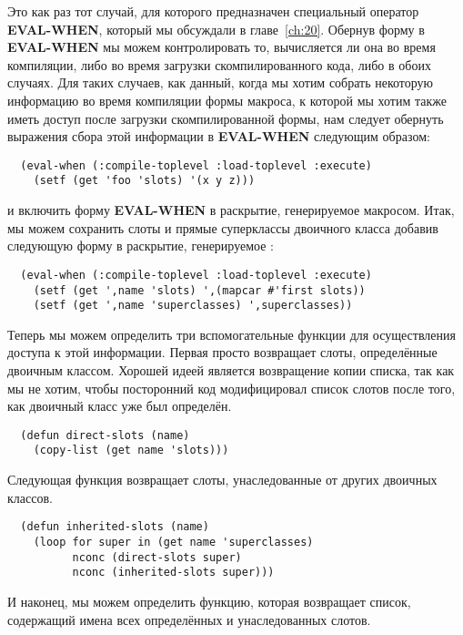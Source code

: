 Это как раз тот случай, для которого предназначен специальный оператор \textbf{EVAL-WHEN},
который мы обсуждали в главе~\ref{ch:20}. Обернув форму в \textbf{EVAL-WHEN} мы можем
контролировать то, вычисляется ли она во время компиляции, либо во время загрузки
скомпилированного кода, либо в обоих случаях. Для таких случаев, как данный, когда мы
хотим собрать некоторую информацию во время компиляции формы макроса, к которой мы хотим
также иметь доступ после загрузки скомпилированной формы, нам следует обернуть выражения
сбора этой информации в \textbf{EVAL-WHEN} следующим образом:

\begin{lstlisting}
  (eval-when (:compile-toplevel :load-toplevel :execute)
    (setf (get 'foo 'slots) '(x y z)))
\end{lstlisting}

и включить форму \textbf{EVAL-WHEN} в раскрытие, генерируемое макросом. Итак, мы можем
сохранить слоты и прямые суперклассы двоичного класса добавив следующую форму в раскрытие,
генерируемое :

\begin{lstlisting}
  (eval-when (:compile-toplevel :load-toplevel :execute)
    (setf (get ',name 'slots) ',(mapcar #'first slots))
    (setf (get ',name 'superclasses) ',superclasses))
\end{lstlisting}

Теперь мы можем определить три вспомогательные функции для осуществления доступа к этой
информации. Первая просто возвращает слоты, определённые двоичным классом. Хорошей идеей
является возвращение копии списка, так как мы не хотим, чтобы посторонний код
модифицировал список слотов после того, как двоичный класс уже был определён.

\begin{lstlisting}
  (defun direct-slots (name)
    (copy-list (get name 'slots)))
\end{lstlisting}

Следующая функция возвращает слоты, унаследованные от других двоичных классов.

\begin{lstlisting}
  (defun inherited-slots (name)
    (loop for super in (get name 'superclasses)
          nconc (direct-slots super)
          nconc (inherited-slots super)))
\end{lstlisting}

И наконец, мы можем определить функцию, которая возвращает список, содержащий имена всех
определённых и унаследованных слотов.

